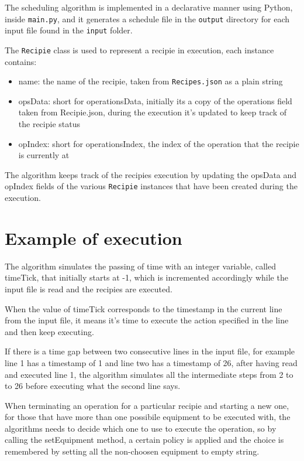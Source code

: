 \documentclass[12pt]{article}
\newcommand{\code}[1]{\colorbox{light-gray}{\texttt{#1}}}
\begin{document}
The scheduling algorithm is implemented in a declarative manner using Python, inside \code{main.py}, and it generates a schedule file in the \code{output} directory for each input file found in the \code {input} folder.

The \code{Recipie} class is used to represent a recipie in execution, each instance contains:
\begin{itemize}
\item name: the name of the recipie, taken from \code{Recipes.json} as a plain string
\item opsData: short for operationsData, initially its a copy of the operations field taken from Recipie.json, during the execution it's updated to keep track of the recipie status
\item opIndex: short for operationsIndex, the index of the operation that the recipie is currently at
\end{itemize}
The algorithm keeps track of the recipies execution by updating the opsData and opIndex fields of the various \code{Recipie} instances that have been created during the execution.

\section{Example of execution}
The algorithm simulates the passing of time with an integer variable, called timeTick, that initially starts at -1, which is incremented accordingly while the input file is read and the recipies are executed.

When the value of timeTick corresponds to the timestamp in the current line from the input file, it means it's time to execute the action specified in the line and then keep executing.

If there is a time gap between two consecutive lines in the input file, for example line 1 has a timestamp of 1 and line two has a timestamp of 26, after having read and executed line 1, the algorithm simulates all the intermediate steps from 2 to to 26 before executing what the second line says.

When terminating an operation for a particular recipie and starting a new one, for those that have more than one possibile equipment to be executed with, the algorithms needs to decide which one to use to execute the operation, so by calling the setEquipment method, a certain policy is applied and the choice is remembered by setting all the non-choosen equipment to empty string.
\end{document}
